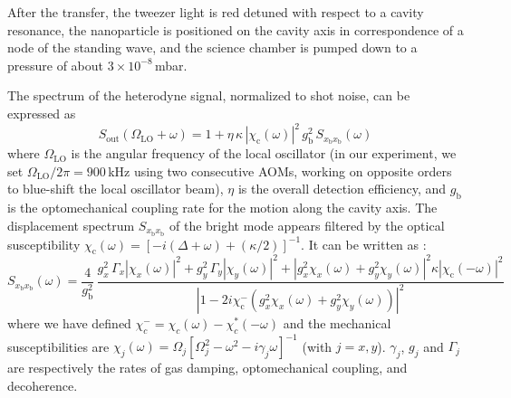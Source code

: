 \documentclass[11pt,floatfix,amssymb,prx,aps,longbibliography,superscriptaddress,nopacs]{revtex4-2}
\newcommand{\om}{\left( \omega \right)}
\newcommand{\OmegaX}{\Omega_{\scriptstyle{x}}}
\newcommand{\OmegaY}{\Omega_{\scriptstyle{y}}}
\newcommand{\GY}{\Gamma_{\scriptstyle{y}}}
\newcommand{\GX}{\Gamma_{\scriptstyle{x}}}
\newcommand{\gX}{g_{\scriptstyle{x}}}
\newcommand{\gY}{g_{\scriptstyle{y}}}
\newcommand{\gb}{g_{\mathrm{b}}}
\newcommand{\Omegamj}{\Omega_{j}}
\begin{document}
After the transfer, the tweezer light is red detuned with respect to a cavity resonance, the nanoparticle is positioned on the cavity axis in correspondence of a node of the standing wave, and the science chamber is pumped down to a pressure of about $3\times10^{-8}\,$mbar. 

The spectrum of the heterodyne signal, normalized to shot noise, can be expressed as
\begin{equation}
S_{\mathrm{out}}(\Omega_{\scriptscriptstyle{\mathrm{LO}}}+\omega) 
= 1 + \eta \,\kappa \,\left|\chi_\mathrm{c}\left(\omega\right)\right|^2 \,\gb^2 \,S_{x_\mathrm{b} x_\mathrm{b}}\om
\label{eq_Sout}
\end{equation}
where 
$\Omega_{\scriptscriptstyle{\mathrm{LO}}}$ is the angular frequency of the local oscillator (in our experiment, we set $\Omega_{\scriptscriptstyle{\mathrm{LO}}}/2\pi = 900\,$kHz using two consecutive AOMs, working on opposite orders to blue-shift the local oscillator beam), $\eta$ is the overall detection efficiency, and $\gb$ is the optomechanical coupling rate for the motion along the cavity axis. 
The displacement spectrum $S_{x_\mathrm{b} x_\mathrm{b}}$ of the bright mode appears filtered by the optical susceptibility $\chi_\mathrm{c}(\omega)=\left[-i(\Delta+\omega)+ (\kappa/2)\right]^{-1}$. It can be written as \cite{SM1}:
\begin{equation}
S_{x_\mathrm{b} x_\mathrm{b}}\om=\frac{4}{\gb^2}\,
\frac{\gX^2 \,\GX \left|\chi_x(\omega)\right|^2
+\gY^2 \,\GY\left|\chi_y(\omega)\right|^2+\left|\gX^2 \chi_x(\omega)+\gY^2 \chi_y(\omega)\right|^2
\kappa \left|\chi_\mathrm{c}\left(-\omega\right)\right|^2}
{\left|1-2 i \chi_\mathrm{c}^{-}\left(\gX^2 \chi_x(\omega)+\gY^2 \chi_y(\omega)\right)\right|^2}
\label{eq:Sxb}
\end{equation}
where we have defined $\chi_{c}^{-}=\chi_{c}\om - \chi_{c}^*\left(-\omega\right)$ and the mechanical susceptibilities are $\chi_{j}\om=\Omegamj \left[\Omegamj^2-\omega^2-i \gamma_{j} \omega\right]^{-1}$ (with $j = x, y$). $\gamma_j$, $g_j$ and $\Gamma_j$ are respectively the rates of gas damping, optomechanical coupling, and decoherence.
\end{document}
